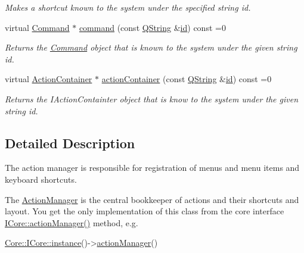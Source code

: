 \begin{DoxyCompactItemize}
\begin{DoxyCompactList}\small\item\em Makes a {\itshape shortcut} known to the system under the specified string {\itshape id}. \end{DoxyCompactList}\item 
virtual \hyperlink{class_core_1_1_command}{Command} $\ast$ \hyperlink{group___core_plugin_ga262e29bf6a8d1cf1fb92dfe93b96621e}{command} (const \hyperlink{group___u_a_v_objects_plugin_gab9d252f49c333c94a72f97ce3105a32d}{Q\-String} \&\hyperlink{glext_8h_a58c2a664503e14ffb8f21012aabff3e9}{id}) const =0
\begin{DoxyCompactList}\small\item\em Returns the \hyperlink{class_core_1_1_command}{Command} object that is known to the system under the given string {\itshape id}. \end{DoxyCompactList}\item 
virtual \hyperlink{class_core_1_1_action_container}{Action\-Container} $\ast$ \hyperlink{group___core_plugin_ga0bd5e0ad7658056a7c80666200734df8}{action\-Container} (const \hyperlink{group___u_a_v_objects_plugin_gab9d252f49c333c94a72f97ce3105a32d}{Q\-String} \&\hyperlink{glext_8h_a58c2a664503e14ffb8f21012aabff3e9}{id}) const =0
\begin{DoxyCompactList}\small\item\em Returns the I\-Action\-Containter object that is know to the system under the given string {\itshape id}. \end{DoxyCompactList}\end{DoxyCompactItemize}


\subsection{Detailed Description}
The action manager is responsible for registration of menus and menu items and keyboard shortcuts. 

The \hyperlink{class_core_1_1_action_manager}{Action\-Manager} is the central bookkeeper of actions and their shortcuts and layout. You get the only implementation of this class from the core interface \hyperlink{group___core_plugin_ga5e44e7795213bb2627acfa08a13f6a12}{I\-Core\-::action\-Manager()} method, e.\-g. 
\begin{DoxyCode}
\hyperlink{group___core_plugin_ga71099762904aac0b404fcd1f93bdc83e}{Core::ICore::instance}()->\hyperlink{group___core_plugin_ga5e44e7795213bb2627acfa08a13f6a12}{actionManager}()
\end{DoxyCode}


